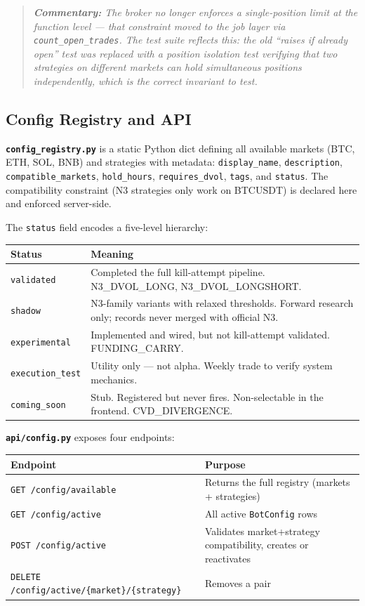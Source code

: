 \documentclass[11pt,a4paper]{article}
\newcommand{\code}[1]{\texttt{#1}}
\newcommand{\comment}[1]{%
  \begin{quote}
    \small\itshape\textbf{Commentary:} #1
  \end{quote}
}
\begin{document}
\comment{The broker no longer enforces a single-position limit at the function level --- that constraint moved to the job layer via \code{count\_open\_trades}. The test suite reflects this: the old ``raises if already open'' test was replaced with a position isolation test verifying that two strategies on different markets can hold simultaneous positions independently, which is the correct invariant to test.}

\subsection{Config Registry and API}

\textbf{\code{config\_registry.py}} is a static Python dict defining all available markets (BTC, ETH, SOL, BNB) and strategies with metadata: \code{display\_name}, \code{description}, \code{compatible\_markets}, \code{hold\_hours}, \code{requires\_dvol}, \code{tags}, and \code{status}. The compatibility constraint (N3 strategies only work on BTCUSDT) is declared here and enforced server-side.

The \code{status} field encodes a five-level hierarchy:

\begin{center}
\begin{tabular}{@{}lp{9cm}@{}}
\toprule
\textbf{Status} & \textbf{Meaning} \\
\midrule
\code{validated} & Completed the full kill-attempt pipeline. N3\_DVOL\_LONG, N3\_DVOL\_LONGSHORT. \\
\code{shadow} & N3-family variants with relaxed thresholds. Forward research only; records never merged with official N3. \\
\code{experimental} & Implemented and wired, but not kill-attempt validated. FUNDING\_CARRY. \\
\code{execution\_test} & Utility only --- not alpha. Weekly trade to verify system mechanics. \\
\code{coming\_soon} & Stub. Registered but never fires. Non-selectable in the frontend. CVD\_DIVERGENCE. \\
\bottomrule
\end{tabular}
\end{center}

\textbf{\code{api/config.py}} exposes four endpoints:

\begin{center}
\begin{tabular}{@{}lp{8cm}@{}}
\toprule
\textbf{Endpoint} & \textbf{Purpose} \\
\midrule
\code{GET /config/available} & Returns the full registry (markets + strategies) \\
\code{GET /config/active} & All active \code{BotConfig} rows \\
\code{POST /config/active} & Validates market+strategy compatibility, creates or reactivates \\
\code{DELETE /config/active/\{market\}/\{strategy\}} & Removes a pair \\
\bottomrule
\end{tabular}
\end{center}
\end{document}
